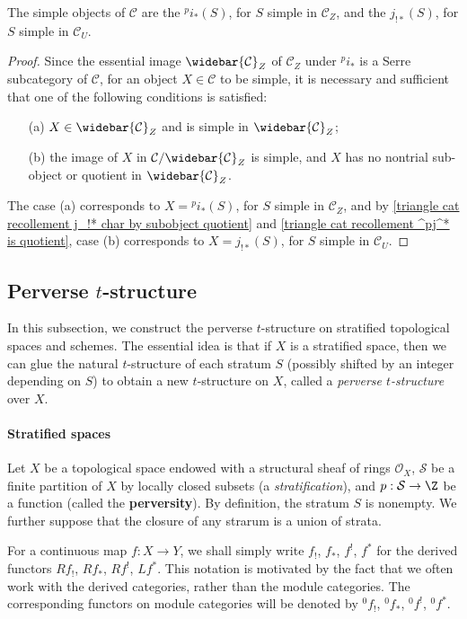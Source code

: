 \begin{proposition}\label{triangle cat recollement simple object of heart char}
The simple objects of $\mathcal{C}$ are the ${^p\!i_*}(S)$, for $S$ simple in $\mathcal{C}_Z$, and the $j_{!*}(S)$, for $S$ simple in $\mathcal{C}_U$.
\end{proposition}
\begin{proof}
Since the essential image $\widebar{\mathcal{C}}_Z$ of $\mathcal{C}_Z$ under ${^p\!i_*}$ is a Serre subcategory of $\mathcal{C}$, for an object $X\in\mathcal{C}$ to be simple, it is necessary and sufficient that one of the following conditions is satisfied:
\begin{enumerate}
    \item[(a)] $X\in\widebar{\mathcal{C}}_Z$ and is simple in $\widebar{\mathcal{C}}_Z$;
    \item[(b)] the image of $X$ in $\mathcal{C}/\widebar{\mathcal{C}}_Z$ is simple, and $X$ has no nontrial sub-object or quotient in $\widebar{\mathcal{C}}_Z$.
\end{enumerate}
The case (a) corresponds to $X={^p\!i_*}(S)$, for $S$ simple in $\mathcal{C}_Z$, and by \cref{triangle cat recollement j_!* char by subobject quotient} and \cref{triangle cat recollement ^pj^* is quotient}, case (b) corresponds to $X=j_{!*}(S)$, for $S$ simple in $\mathcal{C}_U$.
\end{proof}

\subsection{Perverse \texorpdfstring{$t$}{t}-structure}
In this subsection, we construct the perverse $t$-structure on stratified topological spaces and schemes. The essential idea is that if $X$ is a stratified space, then we can glue the natural $t$-structure of each stratum $S$ (possibly shifted by an integer depending on $S$) to obtain a new $t$-structure on $X$, called a \textit{perverse $t$-structure} over $X$.

\paragraph{Stratified spaces}\label{perverse sheaf stratified space paragraph}
Let $X$ be a topological space endowed with a structural sheaf of rings $\mathscr{O}_X$, $\mathcal{S}$ be a finite partition of $X$ by locally closed subsets (a \textit{stratification}), and $p:\mathcal{S}\to\Z$ be a function (called the \textbf{perversity}). By definition, the stratum $S$ is nonempty. We further suppose that the closure of any strarum is a union of strata.\par
For a continuous map $f:X\to Y$, we shall simply write $f_!$, $f_*$, $f^!$, $f^*$ for the derived functors $Rf_!$, $Rf_*$, $Rf^!$, $Lf^*$. This notation is motivated by the fact that we often work with the derived categories, rather than the module categories. The corresponding functors on module categories will be denoted by ${^0f_!}$, ${^0f_*}$, ${^0f^!}$, ${^0f^*}$.

